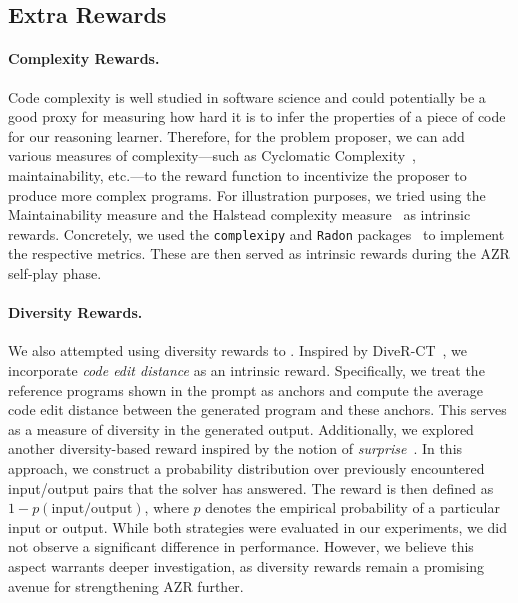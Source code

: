 \documentclass{article}
\begin{document}
\subsection{Extra Rewards}
\paragraph{Complexity Rewards.} Code complexity is well studied in software science and could potentially be a good proxy for measuring how hard it is to infer the properties of a piece of code for our reasoning learner. Therefore, for the problem proposer, we can add various measures of complexity—such as Cyclomatic Complexity~\citep{ebert2016cyclomatic}, maintainability, etc.—to the reward function to incentivize the proposer to produce more complex programs. For illustration purposes, we tried using the Maintainability measure and the Halstead complexity measure~\citep{halstead1977elements} as intrinsic rewards. Concretely, we used the \texttt{complexipy} and \texttt{Radon} packages~\citep{complexipy,radon} to implement the respective metrics. These are then served as intrinsic rewards during the AZR self-play phase.

\paragraph{Diversity Rewards.}
We also attempted using diversity rewards to . Inspired by DiveR-CT~\cite{zhao2024diver}, we incorporate \emph{code edit distance} as an intrinsic reward. Specifically, we treat the reference programs shown in the prompt as anchors and compute the average code edit distance between the generated program and these anchors. This serves as a measure of diversity in the generated output. Additionally, we explored another diversity-based reward inspired by the notion of \emph{surprise}~\cite{zhao2022mixture}. In this approach, we construct a probability distribution over previously encountered input/output pairs that the solver has answered. The reward is then defined as \(1 - p(\text{input/output})\), where \(p\) denotes the empirical probability of a particular input or output. While both strategies were evaluated in our experiments, we did not observe a significant difference in performance. However, we believe this aspect warrants deeper investigation, as diversity rewards remain a promising avenue for strengthening AZR further.
\end{document}
